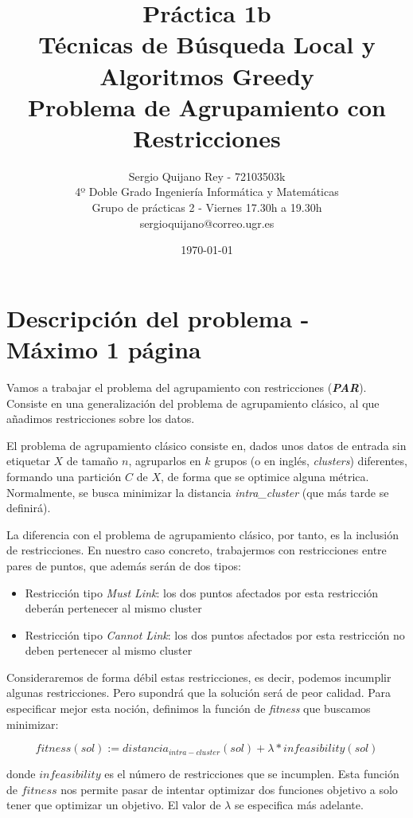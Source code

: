 \documentclass[11pt]{article}
\title{
    {Práctica 1b}\\
    {Técnicas de Búsqueda Local y Algoritmos Greedy}\\
    {Problema de Agrupamiento con Restricciones}\\
}
\author{
    {Sergio Quijano Rey - 72103503k}\\
    {4º Doble Grado Ingeniería Informática y Matemáticas}\\
    {Grupo de prácticas 2 - Viernes 17.30h a 19.30h}\\
    {sergioquijano@correo.ugr.es}
}
\date{\today}
\begin{document}
\maketitle
\pagebreak

\tableofcontents
\pagebreak

\section{Descripción del problema - Máximo 1 página}

Vamos a trabajar el problema del agrupamiento con restricciones (\textbf{\emph{PAR}}). Consiste en una generalización del problema de agrupamiento clásico, al que añadimos restricciones sobre los datos.

El problema de agrupamiento clásico consiste en, dados unos datos de entrada sin etiquetar $X$ de tamaño $n$, agruparlos en $k$ grupos (o en inglés, \emph{clusters}) diferentes, formando una partición $C$ de $X$, de forma que se optimice alguna métrica. Normalmente, se busca minimizar la distancia \emph{intra\_cluster} (que más tarde se definirá).

La diferencia con el problema de agrupamiento clásico, por tanto, es la inclusión de restricciones. En nuestro caso concreto, trabajermos con restricciones entre pares de puntos, que además serán de dos tipos:

\begin{itemize}
    \item Restricción tipo \emph{Must Link}: los dos puntos afectados por esta restricción deberán pertenecer al mismo cluster
    \item Restricción tipo \emph{Cannot Link}: los dos puntos afectados por esta restricción no deben pertenecer al mismo cluster
\end{itemize}

Consideraremos de forma débil estas restricciones, es decir, podemos incumplir algunas restricciones. Pero supondrá que la solución será de peor calidad. Para especificar mejor esta noción, definimos la función de \emph{fitness} que buscamos minimizar:

\begin{displaymath}
    fitness(sol) := distancia_{intra-cluster}(sol) + \lambda * infeasibility(sol)
\end{displaymath}

donde $infeasibility$ es el número de restricciones que se incumplen. Esta función de $fitness$ nos permite pasar de intentar optimizar dos funciones objetivo a solo tener que optimizar un objetivo. El valor de $\lambda$ se especifica más adelante.
\end{document}
